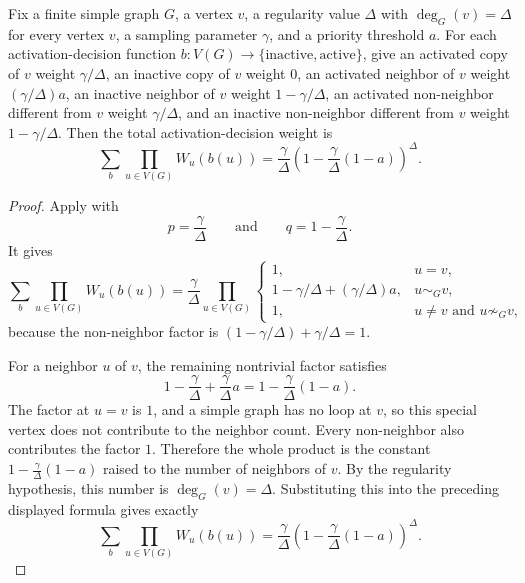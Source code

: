 \begin{helper}
Fix a finite simple graph $G$, a vertex $v$, a regularity value $\Delta$ with
$\deg_G(v)=\Delta$ for every vertex $v$, a sampling parameter $\gamma$, and a
priority threshold $a$.  For each activation-decision function
$b:V(G)\to\{\mathrm{inactive},\mathrm{active}\}$, give an activated copy of
$v$ weight $\gamma/\Delta$, an inactive copy of $v$ weight $0$, an activated
neighbor of $v$ weight $(\gamma/\Delta)a$, an inactive neighbor of $v$ weight
$1-\gamma/\Delta$, an activated non-neighbor different from $v$ weight
$\gamma/\Delta$, and an inactive non-neighbor different from $v$ weight
$1-\gamma/\Delta$.  Then the total activation-decision weight is
\[
\sum_b\prod_{u\in V(G)}W_u(b(u))
=
\frac{\gamma}{\Delta}
\left(1-\frac{\gamma}{\Delta}(1-a)\right)^\Delta .
\]
\end{helper}
\begin{proof}
Apply  with
\[
p=\frac{\gamma}{\Delta}
\qquad\text{and}\qquad
q=1-\frac{\gamma}{\Delta}.
\]
It gives
\[
\sum_b\prod_{u\in V(G)}W_u(b(u))
=
\frac{\gamma}{\Delta}
\prod_{u\in V(G)}
\begin{cases}
1, & u=v,\\
1-\gamma/\Delta+(\gamma/\Delta)a, & u\sim_G v,\\
1, & u\ne v\text{ and }u\not\sim_G v,
\end{cases}
\]
because the non-neighbor factor is
$(1-\gamma/\Delta)+\gamma/\Delta=1$.

For a neighbor $u$ of $v$, the remaining nontrivial factor satisfies
\[
1-\frac{\gamma}{\Delta}+\frac{\gamma}{\Delta}a
=
1-\frac{\gamma}{\Delta}(1-a).
\]
The factor at $u=v$ is $1$, and a simple graph has no loop at $v$, so this
special vertex does not contribute to the neighbor count.  Every
non-neighbor also contributes the factor $1$.  Therefore the whole product is
the constant
$1-\frac{\gamma}{\Delta}(1-a)$ raised to the number of neighbors of $v$.
By the regularity hypothesis, this number is $\deg_G(v)=\Delta$.  Substituting
this into the preceding displayed formula gives exactly
\[
\sum_b\prod_{u\in V(G)}W_u(b(u))
=
\frac{\gamma}{\Delta}
\left(1-\frac{\gamma}{\Delta}(1-a)\right)^\Delta .
\]
\end{proof}
